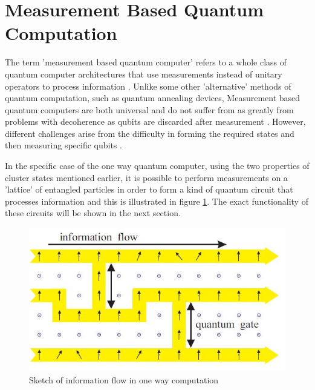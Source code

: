 \section{Measurement Based Quantum Computation}

The term 'measurement based quantum computer' refers to a whole class of quantum computer architectures that use measurements instead of unitary operators to process information \citep{jozsa_introduction_2005}. Unlike some other 'alternative' methods of quantum computation, such as quantum annealing devices, Measurement based quantum computers are both universal and do not suffer from as greatly from problems with decoherence as qubits are discarded after measurement \citep{jozsa_introduction_2005}. However, different challenges arise from the difficulty in forming the required states and then measuring specific qubits \citep{briegel_measurement-based_2009}. 

In the specific case of the one way quantum computer, using the two properties of cluster states mentioned earlier, it is possible to perform measurements on a 'lattice' of entangled particles in order to form a kind of quantum circuit that processes information \cite{raussendorf_one-way_2001} and this is illustrated in figure \ref{fig:one_way}. The exact functionality of these circuits will be shown in the next section.

\begin{figure}
\includegraphics[scale=0.7]{gfx/infoflow.JPG}
\caption{Sketch of information flow in one way computation \citep{raussendorf_measurement-based_2003}}
\label{fig:one_way}
\end{figure}

